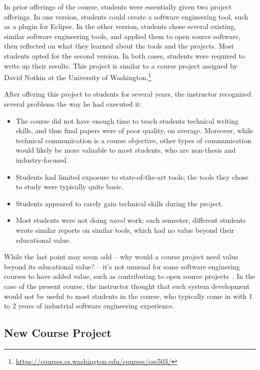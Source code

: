 \documentclass[10pt,conference]{IEEEtran}
\begin{document}

In prior offerings of the course,
students were essentially given two project offerings.
In one version, students could create
a software engineering tool, such as a plugin for Eclipse.
In the other version, students chose several existing,
similar software engineering tools, and applied them
to open source software, then reflected 
on what they learned about the tools and the 
projects.
Most students opted for the second version.
In both cases, students were required to write up their results.
This project is similar to a course project
assigned by David Notkin at the 
University of Washington.\footnote{\url{https://courses.cs.washington.edu/courses/cse503/}}

After offering this project to students for 
several years, the instructor recognized several
problems the way he had executed it:

\begin{itemize}  
  \item The course did not have enough time to teach students
  		technical writing skills, and thus final papers were 
  		of poor quality, on average. Moreover, while technical
  		communication is a course objective, other types of
  		communication would likely be more valuable to most
  		students, who are non-thesis and industry-focused.   		 
  \item Students had limited exposure to state-of-the-art
  		tools; the tools they chose to study were typically
  		quite basic.
  \item Students appeared to rarely gain technical skills 
  		during the project.  
  \item Most students were not doing \emph{novel} work; each semester,
  		different students wrote similar reports on similar tools,
  		which had no value beyond their educational value. 
\end{itemize}

While the last point may seem odd -- why would a course project need
value beyond its educational value? -- it's not unusual for 
some software enginering courses to have added value,
such as contributing to open source projects~\cite{pedroni2007open,meneely2008rose}.
In the case of the present course, the instructor thought 
that such system development would not be useful to most students
in the course, who typically come in with 1 to 2 years of 
industrial software engineering experience. 

\subsection{New Course Project}\label{sec:thisProj}
\end{document}
